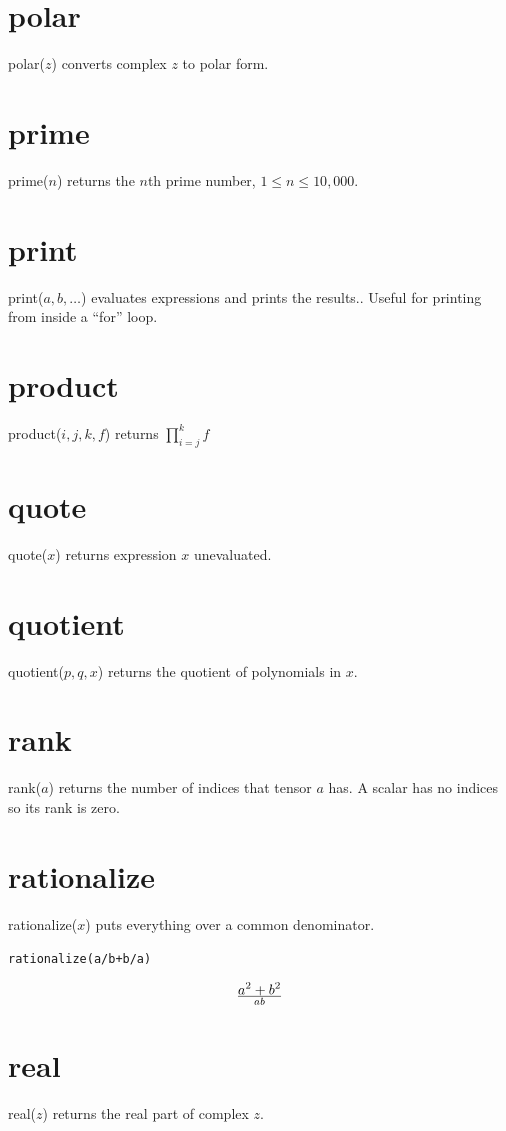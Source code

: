 \documentclass[11pt]{article}
\begin{document}
\section*{polar}
polar($z$) converts complex $z$ to polar form.

\section*{prime}
prime($n$) returns the $n$th prime number, $1\le n\le10{,}000$.

\section*{print}
print($a,b,\ldots$) evaluates expressions and prints the results..
Useful for printing from inside a ``for'' loop.

\section*{product}
product($i,j,k,f$) returns $\displaystyle\prod_{i=j}^k f$

\section*{quote}
quote($x$) returns expression $x$ unevaluated.

\section*{quotient}
quotient($p,q,x$) returns the quotient of polynomials in $x$.

\section*{rank}
rank($a$) returns the number of indices that tensor $a$ has.
A scalar has no indices so its rank is zero.

\section*{rationalize}
rationalize($x$) puts everything over a common denominator.

\medskip
{\tt rationalize(a/b+b/a)}

$$a^2+b^2\over ab$$

\section*{real}
real($z$) returns the real part of complex $z$.
\end{document}
